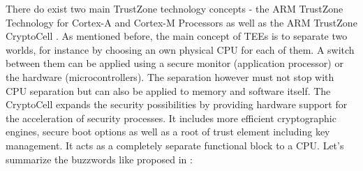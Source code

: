 There do exist two main TrustZone technology concepts - the ARM TrustZone Technology for Cortex-A and Cortex-M Processors as well as the ARM TrustZone CryptoCell \parencite{trustzone}. As mentioned before, the main concept of TEEs is to separate two worlds, for instance by choosing an own physical CPU for each of them. A switch between them can be applied using a secure monitor (application processor) or the hardware (microcontrollers). The separation however must not stop with CPU separation but can also be applied to memory and
software itself. The CryptoCell expands the security possibilities by providing hardware support for the acceleration of security processes.
It includes more efficient
cryptographic engines, secure boot options as well as a root of trust element including key management. It acts as a completely separate functional block to a CPU. Let's summarize the buzzwords like proposed in \parencite{tee_guide}:

